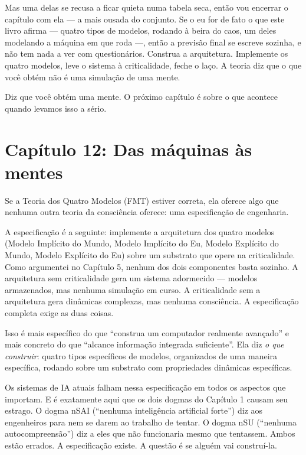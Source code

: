 \documentclass[11pt, twoside, openright]{book}
\begin{document}
Mas uma delas se recusa a ficar quieta numa tabela seca, então vou encerrar o capítulo com ela --- a mais ousada do conjunto. Se o eu for de fato o que este livro afirma --- quatro tipos de modelos, rodando à beira do caos, um deles modelando a máquina em que roda ---, então a previsão final se escreve sozinha, e não tem nada a ver com questionários. Construa a arquitetura. Implemente os quatro modelos, leve o sistema à criticalidade, feche o laço. A teoria diz que o que você obtém não é uma simulação de uma mente.

Diz que você obtém uma mente. O próximo capítulo é sobre o que acontece quando levamos isso a sério.


\chapter*{Capítulo 12: Das máquinas às mentes}

Se a Teoria dos Quatro Modelos (FMT) estiver correta, ela oferece algo que nenhuma outra teoria da consciência oferece: uma especificação de engenharia.

A especificação é a seguinte: implemente a arquitetura dos quatro modelos (Modelo Implícito do Mundo, Modelo Implícito do Eu, Modelo Explícito do Mundo, Modelo Explícito do Eu) sobre um substrato que opere na criticalidade. Como argumentei no Capítulo 5, nenhum dos dois componentes basta sozinho. A arquitetura sem criticalidade gera um sistema adormecido --- modelos armazenados, mas nenhuma simulação em curso. A criticalidade sem a arquitetura gera dinâmicas complexas, mas nenhuma consciência. A especificação completa exige as duas coisas.

Isso é mais específico do que ``construa um computador realmente avançado'' e mais concreto do que ``alcance informação integrada suficiente''. Ela diz \textit{o que construir}: quatro tipos específicos de modelos, organizados de uma maneira específica, rodando sobre um substrato com propriedades dinâmicas específicas.

Os sistemas de IA atuais falham nessa especificação em todos os aspectos que importam. E é exatamente aqui que os dois dogmas do Capítulo 1 causam seu estrago. O dogma nSAI (``nenhuma inteligência artificial forte'') diz aos engenheiros para nem se darem ao trabalho de tentar. O dogma nSU (``nenhuma autocompreensão'') diz a eles que não funcionaria mesmo que tentassem. Ambos estão errados. A especificação existe. A questão é se alguém vai construí-la.
\end{document}
